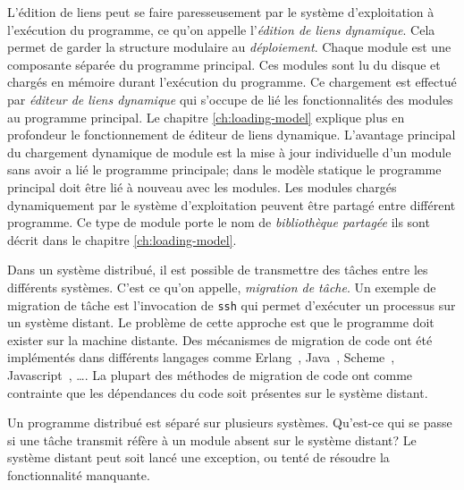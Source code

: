 L'édition de liens peut se faire paresseusement par le système d'exploitation à
l'exécution du programme, ce qu'on appelle l'\textit{édition de liens dynamique}.  Cela
permet de garder la structure modulaire au \textit{déploiement}.
Chaque module est une composante séparée du programme principal.  Ces modules
sont lu du disque et chargés en mémoire durant l'exécution du programme.  Ce
chargement est effectué par \textit{éditeur de liens dynamique} qui s'occupe de
lié les fonctionnalités des modules au programme principal. Le chapitre %
\ref{ch:loading-model} explique plus en profondeur le fonctionnement de éditeur de liens
dynamique. L'avantage principal du chargement dynamique de module est la mise à jour
individuelle d'un module sans avoir a lié le programme principale; dans le
modèle statique le programme principal doit être lié à nouveau avec les modules.
Les modules chargés dynamiquement par le système d'exploitation peuvent être partagé entre différent
programme. Ce type de module porte le nom de \textit{bibliothèque partagée} ils sont décrit dans
le chapitre \ref{ch:loading-model}.


Dans un système distribué, il est possible de transmettre des tâches entre les
différents systèmes. C'est ce qu'on appelle, \textit{migration de tâche}.
Un exemple de migration de tâche est l'invocation de \texttt{ssh} qui permet
d'exécuter un processus sur un système distant. Le problème de cette approche
est que le programme doit exister sur la machine distante.
Des mécanismes de migration de code ont été implémentés dans différents langages
comme Erlang~\cite{DBLP:conf/agere/FrancalanzaZ13}, Java~\cite{And98transparentmigration},
Scheme~\cite{Sumii00animplementation}, Javascript~\cite{DEV2017transparentmigration}, \dots.
La plupart des méthodes de migration de code ont comme contrainte que les dépendances
du code soit présentes sur le système distant.


Un programme distribué est séparé sur plusieurs systèmes. Qu'est-ce qui se passe
si une tâche transmit réfère à un module absent sur le système distant?  Le
système distant peut soit lancé une exception, ou tenté de résoudre la
fonctionnalité manquante.


